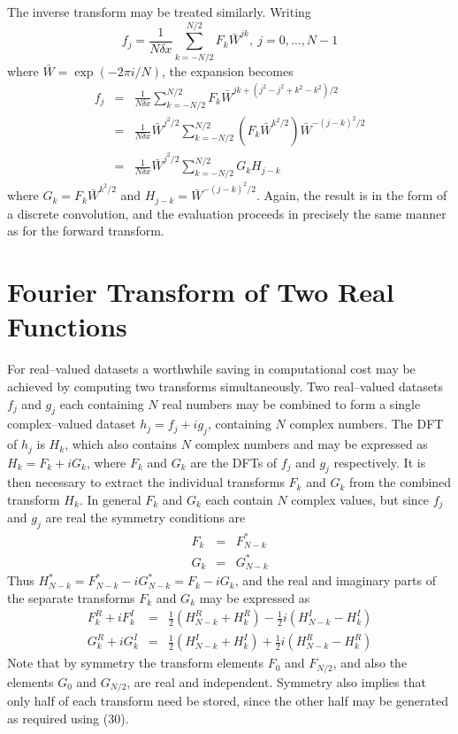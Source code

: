 \documentclass[dvips]{article}
\begin{document}
The inverse transform may be treated similarly.  Writing
\begin{equation}
f_{j} = \frac{1}{N\delta x} \sum_{k=-N/2}^{N/2}F_{k}\bar{W}^{jk},
\ j = 0,\ldots,N-1
\end{equation}
where $\bar{W} = \exp{(-2\pi i/N)}$, the expansion becomes
\begin{eqnarray}
f_{j} & = & \frac{1}{N\delta x} \sum_{k=-N/2}^{N/2}F_{k}
\bar{W}^{jk + (j^{2}-j^{2}+k^{2}-k^{2})/2} \nonumber \\
      & = & \frac{1}{N\delta x}
\bar{W}^{j^{2}/2}\sum_{k=-N/2}^{N/2}\left(F_{k}\bar{W}^{k^{2}/2}\right)
\bar{W}^{-(j-k)^{2}/2} \nonumber \\
  & = & \frac{1}{N\delta x} \bar{W}^{j^{2}/2}\sum_{k=-N/2}^{N/2}G_{k}H_{j-k}
\end{eqnarray}
where $G_{k} = F_{k}\bar{W}^{k^{2}/2}$ and $H_{j-k} = \bar{W}^{-(j-k)^{2}/2}$.
Again, the result is in the form of a discrete convolution, and the
evaluation proceeds in precisely the same manner as for the forward transform.

\section*{Fourier Transform of Two Real Functions}
For real--valued datasets a worthwhile saving in computational cost may be
achieved by computing two transforms simultaneously.  Two real--valued
datasets $f_{j}$ and $g_{j}$ each containing $N$ real numbers may be combined
to form a single complex--valued dataset $h_{j} = f_{j} + ig_{j}$,
containing $N$ complex numbers.  The DFT of $h_{j}$ is $H_{k}$, which
also contains $N$ complex numbers and may be expressed as $H_{k} = F_{k}
+ iG_{k}$, where $F_{k}$ and $G_{k}$ are the DFTs of $f_{j}$ and $g_{j}$
respectively.  It is then necessary to extract the individual transforms
$F_{k}$ and $G_{k}$ from
the combined transform $H_{k}$.  In general $F_{k}$ and $G_{k}$ each
contain $N$ complex values, but since $f_{j}$ and $g_{j}$ are real the
symmetry conditions are
\begin{eqnarray}
F_{k} & = & F_{N-k}^{*}\nonumber \\
G_{k} & = & G_{N-k}^{*}
\end{eqnarray}
Thus $H_{N-k}^{*} = F_{N-k}^{*} - iG_{N-k}^{*} = F_{k} - iG_{k}$, and
the real and imaginary parts of the separate transforms $F_{k}$ and
$G_{k}$ may be expressed as
\begin{eqnarray}
F_{k}^{R} + iF_{k}^{I} & = & \frac{1}{2}\left(H_{N-k}^{R}+H_{k}^{R}\right)
-\frac{1}{2}i\left(H_{N-k}^{I}-H_{k}^{I}\right) \nonumber \\
G_{k}^{R} + iG_{k}^{I} & = & \frac{1}{2}\left(H_{N-k}^{I}+H_{k}^{I}\right)
+\frac{1}{2}i\left(H_{N-k}^{R}-H_{k}^{R}\right) 
\end{eqnarray}
Note that by symmetry the transform elements $F_{0}$ and $F_{N/2}$,
and also the elements $G_{0}$ and $G_{N/2}$, are real and independent.
Symmetry also implies that only half of each transform need be stored,
since the other half may be generated as required using (30).
\end{document}
